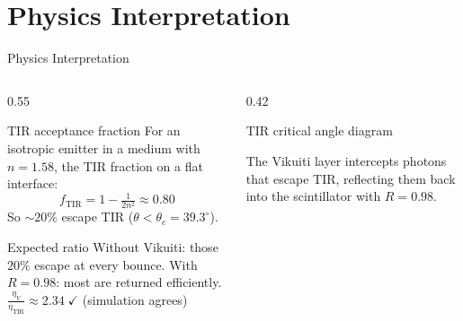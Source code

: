 \documentclass[aspectratio=169,10pt]{beamer}
\begin{document}
\section{Physics Interpretation}

\begin{frame}{Physics Interpretation}

\begin{columns}[T]

  \begin{column}{0.55\textwidth}
  \begin{block}{TIR acceptance fraction}
  \small
  For an isotropic emitter in a medium with $n=1.58$,
  the TIR fraction on a flat interface:
  \[
    f_\text{TIR} = 1 - \tfrac{1}{2n^2} \approx 0.80
  \]
  So $\sim\!20\%$ escape TIR ($\theta < \theta_c = 39.3^\circ$).
  \end{block}

  \begin{block}{Expected ratio}
  \small
  Without Vikuiti: those $20\%$ escape at every bounce.
  With $R=0.98$: most are returned efficiently.\\[0.2em]
  $\displaystyle\frac{\eta_V}{\eta_\text{TIR}} \approx 2.34
  \;\checkmark$ (simulation agrees)
  \end{block}
  \end{column}

  \begin{column}{0.42\textwidth}
  \begin{block}{TIR critical angle diagram}
  \centering
  \end{block}

  {\footnotesize
  The Vikuiti layer intercepts photons that escape TIR,
  reflecting them back into the scintillator with $R=0.98$.
  }
  \end{column}

\end{columns}

\end{frame}
\end{document}
